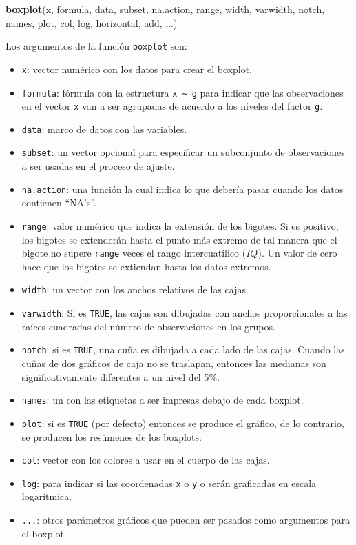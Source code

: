 \documentclass[10pt,]{krantz}
\makeatletter
\newenvironment{Shaded}{\begin{snugshade}}{\end{snugshade}}
\newcommand{\KeywordTok}[1]{\textcolor[rgb]{0.13,0.29,0.53}{\textbf{{#1}}}}
\newcommand{\NormalTok}[1]{{#1}}
\providecommand{\tightlist}{%
  \setlength{\itemsep}{0pt}\setlength{\parskip}{0pt}}
\let\code=\texttt
\newenvironment{kframe}{%
\medskip{}
\setlength{\fboxsep}{.8em}
 \def\at@end@of@kframe{}%
 \ifinner\ifhmode%
  \def\at@end@of@kframe{\end{minipage}}%
  \begin{minipage}{\columnwidth}%
 \fi\fi%
 \def\FrameCommand##1{\hskip\@totalleftmargin \hskip-\fboxsep
 \colorbox{shadecolor}{##1}\hskip-\fboxsep
     \hskip-\linewidth \hskip-\@totalleftmargin \hskip\columnwidth}%
 \MakeFramed {\advance\hsize-\width
   \@totalleftmargin\z@ \linewidth\hsize
   \@setminipage}}%
 {\par\unskip\endMakeFramed%
 \at@end@of@kframe}
\renewenvironment{Shaded}{\begin{kframe}}{\end{kframe}}
\makeatother
\begin{document}
\begin{Shaded}
\begin{Highlighting}[]
\KeywordTok{boxplot}\NormalTok{(x, formula, data, subset, na.action,}
        \NormalTok{range, width, varwidth, notch, names, }
        \NormalTok{plot, col, log, horizontal, add, ...)}
\end{Highlighting}
\end{Shaded}

Los argumentos de la función \texttt{boxplot} son:

\begin{itemize}
\tightlist
\item
  \texttt{x}: vector numérico con los datos para crear el boxplot.
\item
  \texttt{formula}: fórmula con la estructura
  \texttt{x\ \textasciitilde{}\ g} para indicar que las observaciones en
  el vector \texttt{x} van a ser agrupadas de acuerdo a los niveles del
  factor \texttt{g}.
\item
  \texttt{data}: marco de datos con las variables.
\item
  \texttt{subset}: un vector opcional para especificar un subconjunto de
  observaciones a ser usadas en el proceso de ajuste.
\item
  \texttt{na.action}: una función la cual indica lo que debería pasar
  cuando los datos contienen ``NA's''.
\item
  \texttt{range}: valor numérico que indica la extensión de los bigotes.
  Si es positivo, los bigotes se extenderán hasta el punto más extremo
  de tal manera que el bigote no supere \code{range} veces el rango
  intercuatílico (\(IQ\)). Un valor de cero hace que los bigotes se
  extiendan hasta los datos extremos.
\item
  \texttt{width}: un vector con los anchos relativos de las cajas.
\item
  \texttt{varwidth}: Si es \texttt{TRUE}, las cajas son dibujadas con
  anchos proporcionales a las raíces cuadradas del número de
  observaciones en los grupos.
\item
  \texttt{notch}: si es \texttt{TRUE}, una cuña es dibujada a cada lado
  de las cajas. Cuando las cuñas de dos gráficos de caja no se
  traslapan, entonces las medianas son significativamente diferentes a
  un nivel del 5\%.
\item
  \texttt{names}: un con las etiquetas a ser impresas debajo de cada
  boxplot.
\item
  \texttt{plot}: si es \texttt{TRUE} (por defecto) entonces se produce
  el gráfico, de lo contrario, se producen los resúmenes de los
  boxplots.
\item
  \texttt{col}: vector con los colores a usar en el cuerpo de las cajas.
\item
  \texttt{log}: para indicar si las coordenadas \texttt{x} o \texttt{y}
  o serán graficadas en escala logarítmica.
\item
  \texttt{...}: otros parámetros gráficos que pueden ser pasados como
  argumentos para el boxplot.
\end{itemize}
\end{document}

